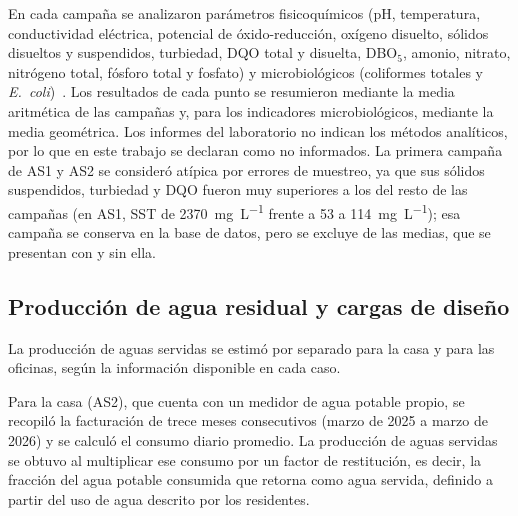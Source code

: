 En cada campaña se analizaron parámetros fisicoquímicos (pH, temperatura, conductividad eléctrica, potencial de óxido-reducción, oxígeno disuelto, sólidos disueltos y suspendidos, turbiedad, DQO total y disuelta, DBO$_5$, amonio, nitrato, nitrógeno total, fósforo total y fosfato) y microbiológicos (coliformes totales y \textit{E.~coli})~\parencite{labucm2026informes}.
Los resultados de cada punto se resumieron mediante la media aritmética de las campañas y, para los indicadores microbiológicos, mediante la media geométrica.
Los informes del laboratorio no indican los métodos analíticos, por lo que en este trabajo se declaran como no informados.
La primera campaña de AS1 y AS2 se consideró atípica por errores de muestreo, ya que sus sólidos suspendidos, turbiedad y DQO fueron muy superiores a los del resto de las campañas (en AS1, SST de \qty{2370}{\milli\gram\per\liter} frente a 53 a \qty{114}{\milli\gram\per\liter}); esa campaña se conserva en la base de datos, pero se excluye de las medias, que se presentan con y sin ella.

\subsection{Producción de agua residual y cargas de diseño}

La producción de aguas servidas se estimó por separado para la casa y para las oficinas, según la información disponible en cada caso.

Para la casa (AS2), que cuenta con un medidor de agua potable propio, se recopiló la facturación de trece meses consecutivos (marzo de 2025 a marzo de 2026) y se calculó el consumo diario promedio.
La producción de aguas servidas se obtuvo al multiplicar ese consumo por un factor de restitución, es decir, la fracción del agua potable consumida que retorna como agua servida, definido a partir del uso de agua descrito por los residentes.

